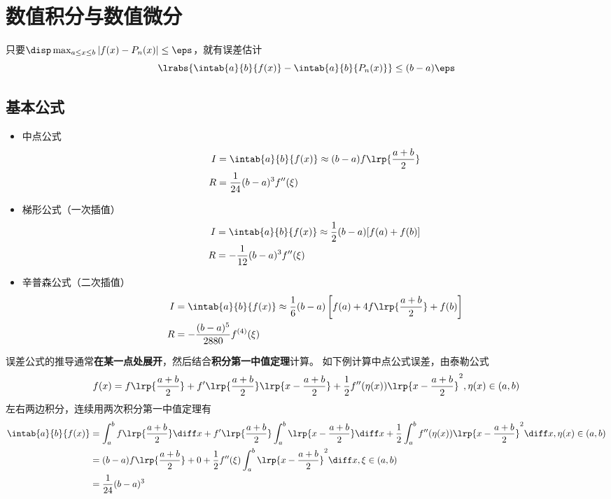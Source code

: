 
\section{数值积分与数值微分} %
只要$\disp\max_{a\leq x\leq b}|f(x)-P_n(x)|\leq\eps$，就有误差估计
\[\lrabs{\intab{a}{b}{f(x)}-\intab{a}{b}{P_n(x)}}\leq (b-a)\eps\]

\subsection{基本公式}
\begin{itemize}
\item 中点公式
\[\begin{aligned}
    I&=\intab{a}{b}{f(x)}\approx(b-a)f\lrp{\frac{a+b}{2}}\\
    R&=\frac{1}{24}(b-a)^3f''(\xi)
\end{aligned}\]
\item 梯形公式（一次插值）
\[\begin{aligned}
    I&=\intab{a}{b}{f(x)}\approx\frac{1}{2}(b-a)[f(a)+f(b)]\\
    R&=-\frac{1}{12}(b-a)^3f''(\xi)
\end{aligned}\]
\item 辛普森公式（二次插值）
\[\begin{aligned}
    I&=\intab{a}{b}{f(x)}\approx\frac{1}{6}(b-a)\left[f(a)+4f\lrp{\frac{a+b}{2}}+f(b)\right]\\
    R&=-\frac{(b-a)^5}{2880}f^{(4)}(\xi)
\end{aligned}\]
\end{itemize}
\begin{analysis}
    误差公式的推导通常\textbf{在某一点处展开}，然后结合\textbf{积分第一中值定理}计算。
    如下例计算中点公式误差，由泰勒公式
    \[f(x)=f\lrp{\frac{a+b}{2}}+f'\lrp{\frac{a+b}{2}}\lrp{x-\frac{a+b}{2}}+\frac{1}{2}f''(\eta(x))\lrp{x-\frac{a+b}{2}}^2,\eta(x)\in(a,b)\]
    左右两边积分，连续用两次积分第一中值定理有
    \[\begin{aligned}
        \intab{a}{b}{f(x)}&=\int_a^b f\lrp{\frac{a+b}{2}}\diff x+f'\lrp{\frac{a+b}{2}}\int_a^b\lrp{x-\frac{a+b}{2}}\diff x+\frac{1}{2}\int_a^b f''(\eta(x))\lrp{x-\frac{a+b}{2}}^2\diff x,\eta(x)\in(a,b)\\
        &=(b-a)f\lrp{\frac{a+b}{2}}+0+\frac{1}{2}f''(\xi)\int_a^b \lrp{x-\frac{a+b}{2}}^2\diff x,\xi\in(a,b)\\
        &=\frac{1}{24}(b-a)^3
    \end{aligned}\]
\end{analysis}

